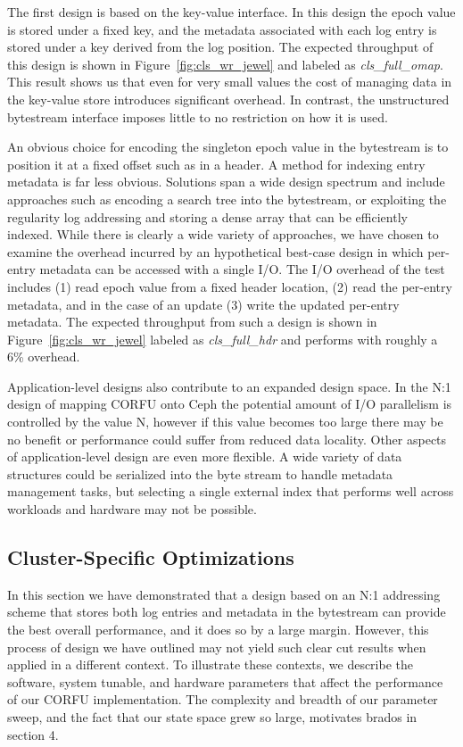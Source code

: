 \documentclass[10pt,twocolumn]{article}
\begin{document}
The first design is based on the key-value interface. In this design the epoch
value is stored under a fixed key, and the metadata associated with each log
entry is stored under a key derived from the log position. The expected throughput of
this design is shown in Figure~\ref{fig:cls_wr_jewel} and labeled as
\emph{cls\_full\_omap}. This result shows us that even for very small values
the cost of managing data in the key-value store introduces significant
overhead. In contrast, the unstructured bytestream interface imposes little
to no restriction on how it is used.

An obvious choice for encoding the singleton epoch value in the bytestream is
to position it at a fixed offset such as in a header. A method for indexing
entry metadata is far less obvious. Solutions span a wide design spectrum and
include approaches such as encoding a search tree into the bytestream, or
exploiting the regularity log addressing and storing a dense array that can be
efficiently indexed. While there is clearly a wide variety of approaches, we
have chosen to examine the overhead incurred by an hypothetical best-case
design in which per-entry metadata can be accessed with a single I/O. The I/O
overhead of the test includes (1) read epoch value from a fixed header
location, (2) read the per-entry metadata, and in the case of an update (3)
write the updated per-entry metadata. The expected throughput from such a
design is shown in Figure~\ref{fig:cls_wr_jewel} labeled as
\emph{cls\_full\_hdr} and performs with roughly a 6\% overhead.

Application-level designs also contribute to an expanded design space.  In the
N:1 design of mapping CORFU onto Ceph the potential amount of I/O parallelism
is controlled by the value N, however if this value becomes too large there may
be no benefit or performance could suffer from reduced data locality. Other
aspects of application-level design are even more flexible. A wide variety of
data structures could be serialized into the byte stream to handle metadata
management tasks, but selecting a single external index that performs well
across workloads and hardware may not be possible.

\subsection{Cluster-Specific Optimizations}

In this section we have demonstrated that a design based on an N:1 addressing
scheme that stores both log entries and metadata in the bytestream can provide
the best overall performance, and it does so by a large margin. However, this
process of design we have outlined may not yield such clear cut results when
applied in a different context. To illustrate these contexts, we describe the
software, system tunable, and hardware parameters that affect the performance
of our CORFU implementation. The complexity and breadth of our parameter sweep,
and the fact that our state space grew so large, motivates brados in section 4.
\end{document}
